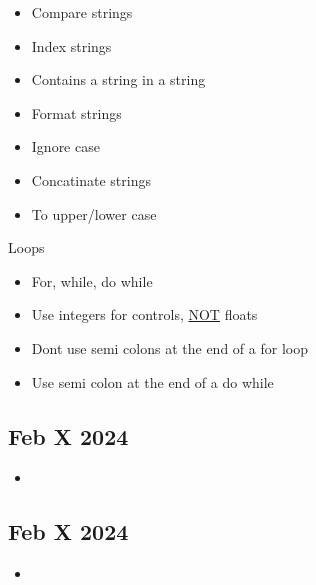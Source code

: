 \documentclass[12pt]{article}
\begin{document}
\begin{itemize}
			\item Compare strings 
			\item Index strings
			\item Contains a string in a string
			\item Format strings
			\item Ignore case
			\item Concatinate strings
			\item To upper/lower case
\end{itemize}

Loops

\begin{itemize}
		  \item For, while, do while 
		  \item Use integers for controls, \underline{NOT} floats
		  \item Dont use semi colons at the end of a for loop
		  \item Use semi colon at the end of a do while
\end{itemize}

\subsection*{Feb X 2024}

\begin{itemize}
		  \item 
\end{itemize}

\subsection*{Feb X 2024}

\begin{itemize}
		  \item 
\end{itemize}
\end{document}
